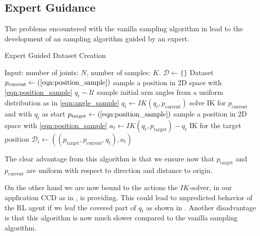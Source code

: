 \subsection{Expert Guidance}

The problems encountered with the vanilla sampling algorithm in  lead to the development of an sampling algorithm guided by an expert. 

\begin{algorithm}
    \caption{Expert Guided Dataset Creation}\label{alg:Expert_Dataset}
    \begin{algorithmic}
        \State{} Input: number of joints: $N$, number of samples: $K$.
        \State{} $\mathcal{D} \leftarrow \{\}$  Dataset
            \State{} $p_{\text{current}} \leftarrow (\text{\ref{eqn:position_sample}})$ sample a position in 2D space with \eqref{eqn:position_sample}
            \State{} $q_t \sim \mathcal{U}$ sample initial arm angles from a uniform distribution as in \eqref{eqn:angle_sample}
            \State{} $q_t \leftarrow IK(q_t, p_{\text{current}})$ solve IK for $p_{\text{current}}$ and with $q_t$ as start
            \State{} $p_{\text{target}} \leftarrow (\text{\ref{eqn:position_sample}})$ sample a position in 2D space with \eqref{eqn:position_sample}
            \State{} $a_t \leftarrow IK(q_t, p_{\text{target}}) - q_t$ IK for the target position
            \State{} $\mathcal{D}_i \leftarrow ((p_{\text{target}}, p_{\text{current}}, q_t), a_t)$
        \EndFor{}
\end{algorithmic}
\end{algorithm}
The clear advantage from this algorithm is that we ensure now that $p_{\text{target}}$ and $p_{\text{current}}$ are uniform with respect to direction and distance to origin.

On the other hand we are now  bound to the actions the $IK$-solver, in our application CCD as in , is providing. This could lead to unpredicted behavior of the RL agent if we leaf the covered part of $q_t$ as shown in . Another disadvantage is that this algorithm is now much slower compared to the vanilla sampling algorithm. 

